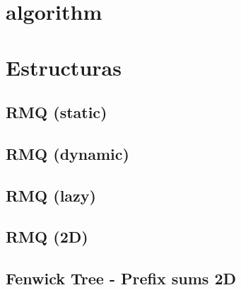 

\def\title{El Bueno, el Ralo y el Feo - FCEyN, Universidad de Buenos Aires}

\section{algorithm}%


\section{Estructuras}%
\subsection{RMQ (static)}
\subsection{RMQ (dynamic)} 
\subsection{RMQ (lazy)}
\subsection{RMQ (2D)}
\subsection{Fenwick Tree - Prefix sums 2D} %
